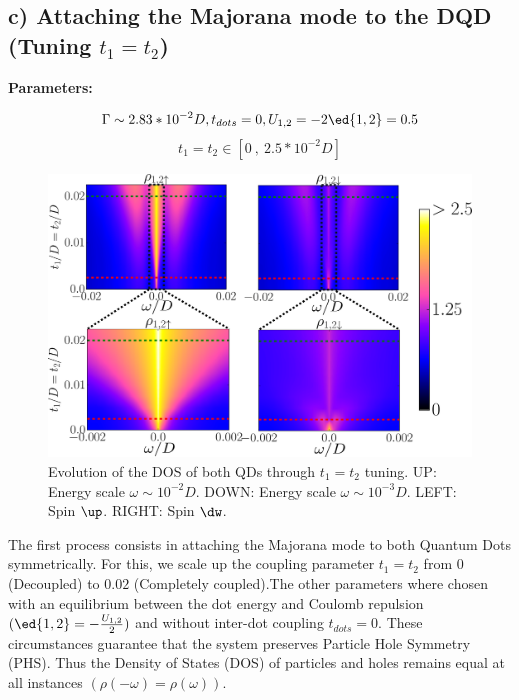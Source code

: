 \newpage


\subsection*{c) Attaching the Majorana mode to the DQD (Tuning $t_1=t_2$) \label{sec:t1=t2}}

\textbf{Parameters:}

$$\Gamma \sim 2.83*10^{-2}D, t_{dots}=0 , U_{1,2} = -2\ed{1,2} = 0.5$$
$$t_1=t_2 \in [0\  ,\  2.5*10^{-2}D]$$

\begin{figure}[hbt]
\centering
\includegraphics[scale=0.35]{IMAGES/t1=t2/2D.png}
\caption{\label{fig:2D/Shift_t1=t2} Evolution of the DOS of both QDs through $t_1 = t_2$ tuning. UP: Energy scale $\omega \sim 10^{-2}D$. DOWN: Energy scale $\omega \sim 10^{-3}D$. LEFT: Spin $\up$. RIGHT: Spin $\dw$.}
\end{figure}



The first process consists in attaching the Majorana mode to both Quantum Dots symmetrically. For this, we scale up the coupling parameter $t_1=t_2$ from $0$ (Decoupled) to $0.02$ (Completely coupled).The other parameters where chosen with an equilibrium between the dot energy and Coulomb repulsion $(\ed{1,2}=-\frac{U_{1,2}}{2})$  and  without inter-dot coupling $t_{dots}=0$. These circumstances guarantee that the system preserves Particle Hole Symmetry (PHS). Thus the Density of States (DOS) of particles and holes remains equal at all instances $(\rho(-\omega) = \rho(\omega))$. \\

